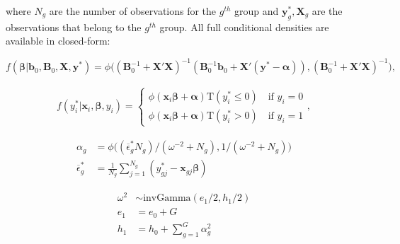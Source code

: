 \documentclass[11pt,a4paper]{article}
\newcommand{\f}{\mathit{f}}
\begin{document}
where $N_g$ are the number of observations for the $g^{th}$ group and $\mathbf{y}_g^*, \mathbf{X}_{g}$ are the observations that belong to the $g^{th}$ group. All full conditional densities are available in closed-form: 

\begin{equation}
	\f(\boldsymbol{\beta} | \mathbf{b}_0, \mathbf{B}_0, \mathbf{X}, \mathbf{y}^{*}) = 
		\phi \big (  (\mathbf{B}_0^{-1} + \mathbf{X}'\mathbf{X})^{-1} (\mathbf{B}_0^{-1} \mathbf{b}_0 + \mathbf{X}'(\mathbf{y}^{*}-\bm{\alpha})), (\mathbf{B}_0^{-1} + \mathbf{X}'\mathbf{X})^{-1} \big ),
\end{equation} 

\begin{equation}
\begin{split}
	  \f(y_{i}^{*} | \mathbf{x}_i, \boldsymbol{\beta}, y_i)  = \left \{
	  \begin{array}{ll}
	    	\phi(\mathbf{x}_i \boldsymbol{\beta}+\bm{\alpha})\mathrm{T}(y_i^* \leq 0) \quad \text{if \ } y_i = 0 \\
	    	\phi(\mathbf{x}_i \boldsymbol{\beta}+\bm{\alpha})\mathrm{T}(y_i^* > 0) \quad \text{if \ } y_i = 1
	  \end{array} \right.,
\end{split}	
\end{equation}


\begin{equation}
\begin{split}
	\alpha_g &= \phi \big (  (\overline{\epsilon}_g^{*} N_g)/(\omega^{-2} + N_g) , 1/(\omega^{-2} + N_g) \big ) \\
	\overline{\epsilon}_g^{*} &= \frac{1}{N_g} \sum_{j=1}^{N_g} (y_{gj}^{*} - \mathbf{x}_{gj}\bm{\beta})
\end{split}
\end{equation}


\begin{equation}
\begin{split}
	\omega^2 &\sim \mathrm{invGamma}(e_1/2,h_1/2) \\
	e_1 &= e_0 + G \\
	h_1 &= h_0 + \sum_{g=1}^G \alpha_g^2 \\
\end{split}
\end{equation}




\end{document}
